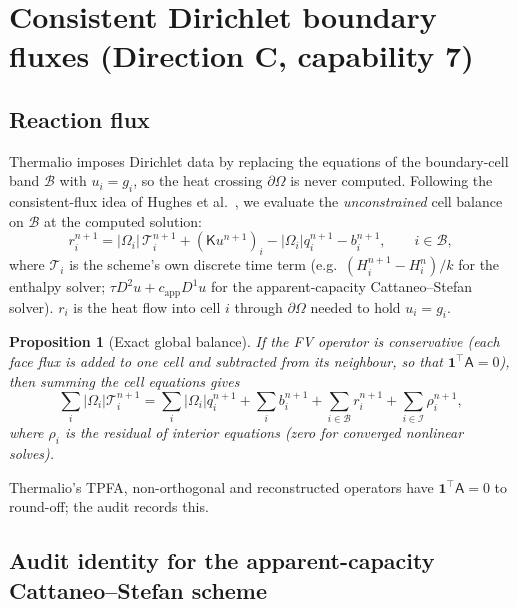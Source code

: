 \documentclass[11pt]{article}
\numberwithin{equation}{section}
\newtheorem{proposition}{Proposition}[section]
\theoremstyle{remark}
\newcommand{\K}{\mathsf{K}}
\newcommand{\capp}{c_{\mathrm{app}}}
\begin{document}
\section{Consistent Dirichlet boundary fluxes (Direction C, capability 7)}

\subsection{Reaction flux}

Thermalio imposes Dirichlet data by replacing the equations of the boundary-cell
band $\mathcal B$ with $u_i=g_i$, so the heat crossing $\partial\Omega$ is never
computed.  Following the consistent-flux idea of Hughes et al.\ \cite{hughes2000},
we evaluate the \emph{unconstrained} cell balance on $\mathcal B$ at the
computed solution:
\begin{equation}
  r_i^{n+1} = |\Omega_i|\,\mathcal T_i^{n+1} + (\K u^{n+1})_i - |\Omega_i|q_i^{n+1}-b_i^{n+1},
  \qquad i\in\mathcal B,
  \label{eq:reaction}
\end{equation}
where $\mathcal T_i$ is the scheme's own discrete time term (e.g.\
$(H_i^{n+1}-H_i^n)/k$ for the enthalpy solver;
$\tau D^2u+\capp D^1u$ for the apparent-capacity Cattaneo--Stefan solver).
$r_i$ is the heat flow into cell $i$ through $\partial\Omega$ needed to hold
$u_i=g_i$.

\begin{proposition}[Exact global balance]
If the FV operator is conservative (each face flux is added to one cell and
subtracted from its neighbour, so that $\mathbf 1^{\!\top}\mathsf A=0$), then
summing the cell equations gives
\begin{equation}
  \sum_i|\Omega_i|\mathcal T_i^{n+1}=\sum_i|\Omega_i|q_i^{n+1}+\sum_ib_i^{n+1}
  +\sum_{i\in\mathcal B}r_i^{n+1}+\sum_{i\in\mathcal I}\rho_i^{n+1},
\end{equation}
where $\rho_i$ is the residual of interior equations (zero for converged nonlinear solves).
\end{proposition}
Thermalio's TPFA, non-orthogonal and reconstructed operators have
$\mathbf 1^{\!\top}\mathsf A=0$ to round-off; the audit records this.

\subsection{Audit identity for the apparent-capacity Cattaneo--Stefan scheme}
\end{document}
